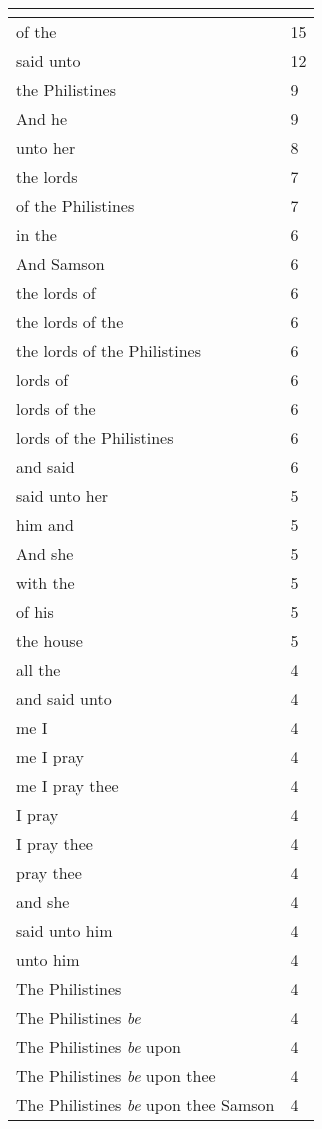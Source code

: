 \begin{center}
\begin{longtable}{|p{3.0in}|p{0.5in}|}
\hline \multicolumn{2}{c}{{ }} \\ \hline
\endfoot 
of the & 15\\ \hline 
said unto & 12\\ \hline 
the Philistines & 9\\ \hline 
And he & 9\\ \hline 
unto her & 8\\ \hline 
the lords & 7\\ \hline 
of the Philistines & 7\\ \hline 
in the & 6\\ \hline 
And Samson & 6\\ \hline 
the lords of & 6\\ \hline 
the lords of the & 6\\ \hline 
the lords of the Philistines & 6\\ \hline 
lords of & 6\\ \hline 
lords of the & 6\\ \hline 
lords of the Philistines & 6\\ \hline 
and said & 6\\ \hline 
said unto her & 5\\ \hline 
him and & 5\\ \hline 
And she & 5\\ \hline 
with the & 5\\ \hline 
of his & 5\\ \hline 
the house & 5\\ \hline 
all the & 4\\ \hline 
and said unto & 4\\ \hline 
me I & 4\\ \hline 
me I pray & 4\\ \hline 
me I pray thee & 4\\ \hline 
I pray & 4\\ \hline 
I pray thee & 4\\ \hline 
pray thee & 4\\ \hline 
and she & 4\\ \hline 
said unto him & 4\\ \hline 
unto him & 4\\ \hline 
The Philistines & 4\\ \hline 
The Philistines \emph{be} & 4\\ \hline 
The Philistines \emph{be} upon & 4\\ \hline 
The Philistines \emph{be} upon thee & 4\\ \hline 
The Philistines \emph{be} upon thee Samson & 4\\ \hline 

\end{longtable}
\end{center}
